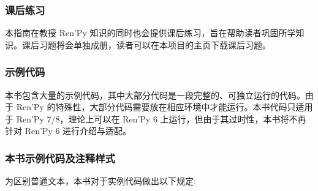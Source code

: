 \documentclass[../Main.tex]{subfiles}
\begin{document}
\subsubsection*{课后练习}
本指南在教授 Ren'Py 知识的同时也会提供课后练习，旨在帮助读者巩固所学知识。课后习题将会单独成册，读者可以在本项目的主页下载课后习题。

\subsubsection*{示例代码}
本书包含大量的示例代码，其中大部分代码是一段完整的、可独立运行的代码。由于 Ren'Py 的特殊性，大部分代码需要放在相应环境中才能运行。本书代码只适用于 Ren'Py 7/8，理论上可以在 Ren'Py 6 上运行，但由于其过时性，本书将不再针对 Ren'Py 6 进行介绍与适配。

\subsubsection*{本书示例代码及注释样式}
为区别普通文本，本书对于实例代码做出以下规定:
\end{document}
